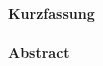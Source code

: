 \cleardoublepage

\begin{center}
\paragraph{Kurzfassung}
\hrulefill
\end{center}

\vspace {2cm}
\begin{center}
\paragraph{Abstract}
\hrulefill
\end{center}
